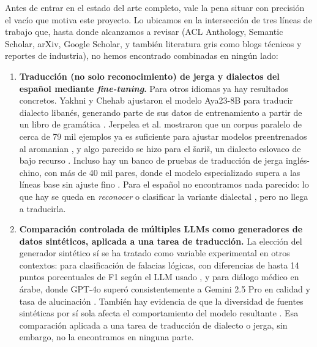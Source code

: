 \documentclass[11pt,a4paper]{article}
\begin{document}
Antes de entrar en el estado del arte completo, vale la pena situar con precisión el vacío que motiva este proyecto. Lo ubicamos en la intersección de tres líneas de trabajo que, hasta donde alcanzamos a revisar (ACL Anthology, Semantic Scholar, arXiv, Google Scholar, y también literatura gris como blogs técnicos y reportes de industria), no hemos encontrado combinadas en ningún lado:

\begin{enumerate}[label=(\roman*)]
    \item \textbf{Traducción (no solo reconocimiento) de jerga y dialectos del español mediante \textit{fine-tuning}.} Para otros idiomas ya hay resultados concretos. Yakhni y Chehab ajustaron el modelo Aya23-8B para traducir dialecto libanés, generando parte de sus datos de entrenamiento a partir de un libro de gramática \cite{yakhni2025lebanese}. Jerpelea et al. mostraron que un corpus paralelo de cerca de 79 mil ejemplos ya es suficiente para ajustar modelos preentrenados al aromanian \cite{jerpelea2025aromanian}, y algo parecido se hizo para el šariš, un dialecto eslovaco de bajo recurso \cite{ondrejova2024saris}. Incluso hay un banco de pruebas de traducción de jerga inglés-chino, con más de 40 mil pares, donde el modelo especializado supera a las líneas base sin ajuste fino \cite{liang2025slangdit}. Para el español no encontramos nada parecido: lo que hay se queda en \emph{reconocer} o clasificar la variante dialectal \cite{martinez2025spanish, zander2026register}, pero no llega a traducirla.

    \item \textbf{Comparación controlada de múltiples LLMs como generadores de datos sintéticos, aplicada a una tarea de traducción.} La elección del generador sintético sí se ha tratado como variable experimental en otros contextos: para clasificación de falacias lógicas, con diferencias de hasta 14 puntos porcentuales de F1 según el LLM usado \cite{poliakov2025missynth}, y para diálogo médico en árabe, donde GPT-4o superó consistentemente a Gemini 2.5 Pro en calidad y tasa de alucinación \cite{allam2025arabic}. También hay evidencia de que la diversidad de fuentes sintéticas por sí sola afecta el comportamiento del modelo resultante \cite{schaffelder2026eggs}. Esa comparación aplicada a una tarea de traducción de dialecto o jerga, sin embargo, no la encontramos en ninguna parte.


\end{enumerate}
\end{document}
